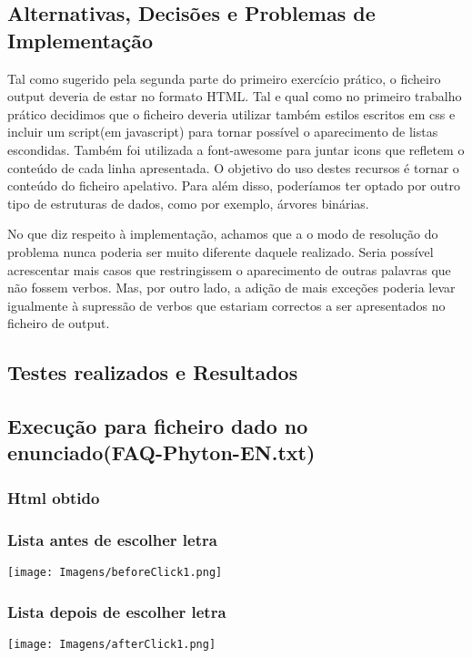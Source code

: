 \documentclass{report}
\begin{document}
\subsection{Alternativas, Decisões e Problemas de Implementação}
Tal como sugerido pela segunda parte do primeiro exercício prático, 
o ficheiro output deveria de estar no formato HTML. Tal e qual como 
no primeiro trabalho prático decidimos que o ficheiro deveria utilizar 
também estilos escritos em css e incluir um script(em javascript) para 
tornar possível o aparecimento de listas escondidas. 
Também foi utilizada a font-awesome para juntar icons que refletem o 
conteúdo de cada linha apresentada. O objetivo do uso destes recursos é 
tornar o conteúdo do ficheiro apelativo. Para além disso, poderíamos ter 
optado por outro tipo de estruturas de dados, como por exemplo, árvores binárias. 

No que diz respeito à implementação, achamos que a o modo de 
resolução do problema nunca poderia ser muito diferente daquele realizado. 
Seria possível acrescentar mais casos que restringissem o aparecimento de 
outras palavras que não fossem verbos. Mas, por outro lado, a adição de mais 
exceções poderia levar igualmente à supressão de verbos 
que estariam correctos a ser apresentados no ficheiro de output.

\subsection{Testes realizados e Resultados}

\subsection{Execução para ficheiro dado no enunciado(FAQ-Phyton-EN.txt)}

\subsubsection{Html obtido}
\subsubsection{Lista antes de escolher letra} 
\texttt{[image: Imagens/beforeClick1.png]} \\
\subsubsection{Lista depois de escolher letra} 
\texttt{[image: Imagens/afterClick1.png]} \\
\end{document}
